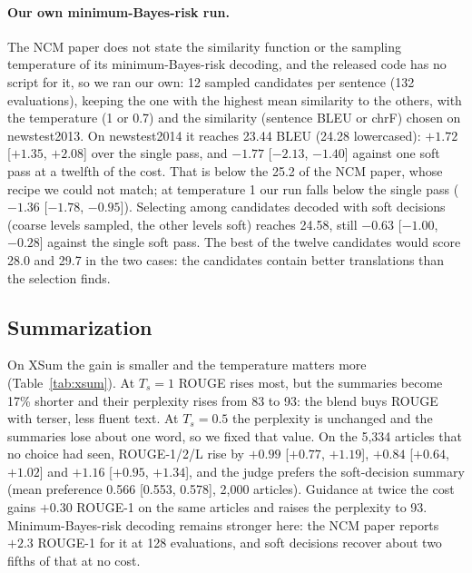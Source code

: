 \documentclass[11pt]{article}
\begin{document}
\paragraph{Our own minimum-Bayes-risk run.} The NCM paper does not state the similarity function or the sampling
temperature of its minimum-Bayes-risk decoding, and the released code has no script for it, so we ran our own: 12
sampled candidates per sentence (132 evaluations), keeping the one with the highest mean similarity to the others,
with the temperature (1 or 0.7) and the similarity (sentence BLEU or chrF) chosen on newstest2013. On newstest2014 it
reaches 23.44 BLEU (24.28 lowercased): $+1.72$ [$+1.35$, $+2.08$] over the single pass, and $-1.77$ [$-2.13$,
$-1.40$] against one soft pass at a twelfth of the cost. That is below the 25.2 of the NCM paper, whose recipe we
could not match; at temperature 1 our run falls below the single pass ($-1.36$ [$-1.78$, $-0.95$]). Selecting among
candidates decoded with soft decisions (coarse levels sampled, the other levels soft) reaches 24.58, still $-0.63$
[$-1.00$, $-0.28$] against the single soft pass. The best of the twelve candidates would score 28.0 and 29.7 in the
two cases: the candidates contain better translations than the selection finds.

\subsection{Summarization}

On XSum the gain is smaller and the temperature matters more (Table~\ref{tab:xsum}). At $T_s=1$ ROUGE rises most, but
the summaries become 17\% shorter and their perplexity rises from 83 to 93: the blend buys ROUGE with terser, less
fluent text. At $T_s=0.5$ the perplexity is unchanged and the summaries lose about one word, so we fixed that value. On
the 5,334 articles that no choice had seen, ROUGE-1/2/L rise by $+0.99$ [$+0.77$, $+1.19$], $+0.84$ [$+0.64$,
$+1.02$] and $+1.16$ [$+0.95$, $+1.34$], and the judge prefers the soft-decision summary (mean preference 0.566
[0.553, 0.578], 2,000 articles). Guidance at twice the cost gains $+0.30$ ROUGE-1 on the same articles and raises the
perplexity to 93. Minimum-Bayes-risk decoding remains stronger here: the NCM paper reports $+2.3$ ROUGE-1 for it at
128 evaluations, and soft decisions recover about two fifths of that at no cost.
\end{document}
